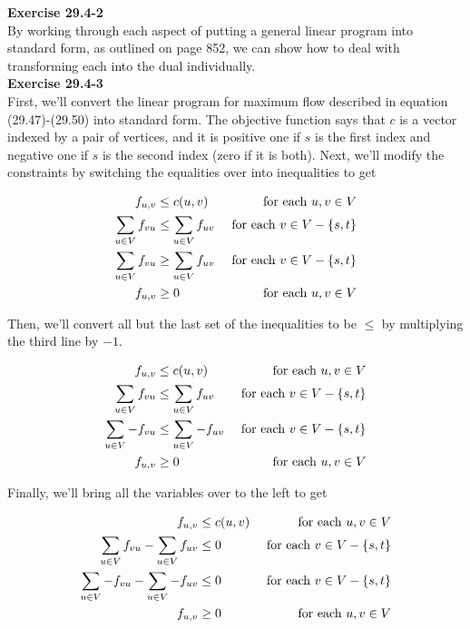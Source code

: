 \documentclass{article}
\begin{document}
\noindent\textbf{Exercise 29.4-2}\\

By working through each aspect of putting a general linear program into standard form, as outlined on page 852, we can show how to deal with transforming each into the dual individually.  \\

\noindent\textbf{Exercise 29.4-3}\\


First, we'll convert the linear program for maximum flow described in equation (29.47)-(29.50) into standard form. The objective function says that $c$ is a vector indexed by a pair of vertices, and it is positive one if $s$ is the first index and negative one if $s$ is the second index (zero if it is both). Next, we'll modify the constraints by switching the equalities over into inequalities to get

\begin{align*}
f_{u,v} &\le c(u,v) &\hbox{ for each $u,v\in V$}\\
\sum_{u\in V} f_{vu} &\le \sum_{u\in V} f_{uv}  &\hbox{ for each $v\in V - \{s,t\}$}\\
\sum_{u\in V} f_{vu} &\ge \sum_{u\in V} f_{uv}  &\hbox{ for each $v\in V - \{s,t\}$}\\
f_{u,v} &\ge 0 &\hbox{ for each $u,v\in V$}\\
\end{align*}

Then, we'll convert all but the last set of the inequalities to be $\le$ by multiplying the third line by $-1$.

\begin{align*}
f_{u,v} &\le c(u,v) &\hbox{ for each $u,v\in V$}\\
\sum_{u\in V} f_{vu} &\le \sum_{u\in V} f_{uv}  &\hbox{ for each $v\in V - \{s,t\}$}\\
\sum_{u\in V} -f_{vu} &\le \sum_{u\in V} -f_{uv}  &\hbox{ for each $v\in V - \{s,t\}$}\\
f_{u,v} &\ge 0 &\hbox{ for each $u,v\in V$}\\
\end{align*}

Finally, we'll bring all the variables over to the left to get

\begin{align*}
f_{u,v} &\le c(u,v) &\hbox{ for each $u,v\in V$}\\
\sum_{u\in V} f_{vu} -\sum_{u\in V} f_{uv}&\le 0  &\hbox{ for each $v\in V - \{s,t\}$}\\
\sum_{u\in V} -f_{vu} - \sum_{u\in V} -f_{uv}&\le 0  &\hbox{ for each $v\in V - \{s,t\}$}\\
f_{u,v} &\ge 0 &\hbox{ for each $u,v\in V$}\\
\end{align*}
\end{document}
